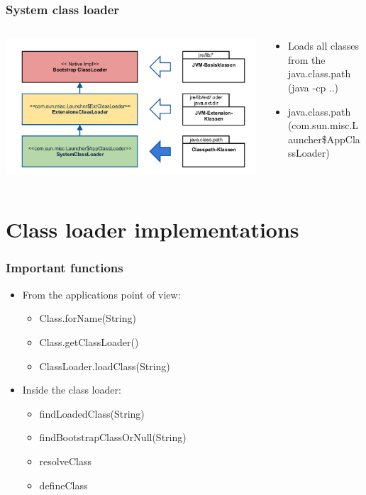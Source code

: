 \documentclass[aspectratio=169]{beamer}
\begin{document}
\begin{frame}
	\frametitle{System class loader}
	\begin{columns}[T] 
	\begin{column}{.46\textwidth}
		\includegraphics[scale=0.06]{assets/classloader-hierachie-system-active.png} %
	\end{column}
	\hfill
	\begin{column}{.56\textwidth}

	\begin{itemize}
		\item{Loads all classes from the java.class.path (java -cp ..)}
		\item{java.class.path (com.sun.misc.Launcher\$AppClassLoader)}
	\end{itemize}

	\end{column}
	\end{columns}
\end{frame}

\section{Class loader implementations}

\begin{frame}
	\frametitle{Important functions}
	\begin{itemize}
		\item{From the applications point of view:}
			\begin{itemize}
				\item{Class.forName(String)}
				\item{Class.getClassLoader()}
				\item{ClassLoader.loadClass(String)}
			\end{itemize}
		\item{Inside the class loader:}
			\begin{itemize}
				\item{findLoadedClass(String)}
				\item{findBootstrapClassOrNull(String)}
				\item{resolveClass}
				\item{defineClass}
			\end{itemize}
	\end{itemize}
\end{frame}
\end{document}
